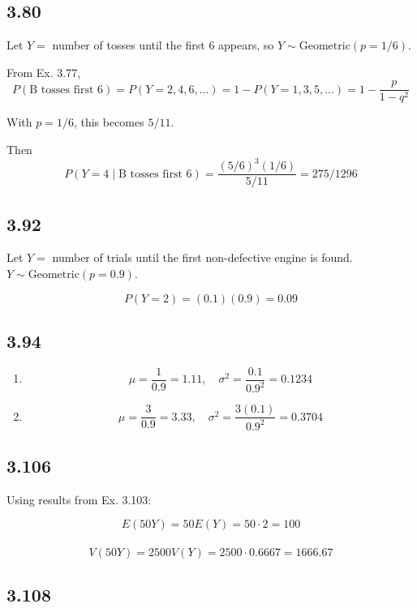 \documentclass[
  letterpaper,
  DIV=11,
  numbers=noendperiod]{scrartcl}
\begin{document}
\subsection{3.80}\label{section-11}

Let \(Y =\) number of tosses until the first 6 appears, so
\(Y \sim \text{Geometric}(p=1/6)\).

From Ex. 3.77,\\
\[P(\text{B tosses first 6}) = P(Y=2,4,6,\ldots) = 1 - P(Y=1,3,5,\ldots) = 1 - \frac{p}{1-q^2}\]

With \(p=1/6\), this becomes \(5/11\).

Then\\
\[P(Y=4 \mid \text{B tosses first 6}) = \frac{(5/6)^3 (1/6)}{5/11} = 275/1296\]

\subsection{3.92}\label{section-12}

Let \(Y =\) number of trials until the first non-defective engine is
found. \(Y \sim \text{Geometric}(p=0.9)\).

\[P(Y=2) = (0.1)(0.9) = 0.09\]

\subsection{3.94}\label{section-13}

\begin{enumerate}
\def\labelenumi{(\alph{enumi})}
\item
  \[\mu = \frac{1}{0.9} = 1.11, \quad \sigma^2 = \frac{0.1}{0.9^2} = 0.1234\]
\item
  \[\mu = \frac{3}{0.9} = 3.33, \quad \sigma^2 = \frac{3(0.1)}{0.9^2} = 0.3704\]
\end{enumerate}

\subsection{3.106}\label{section-14}

Using results from Ex. 3.103:

\[E(50Y) = 50E(Y) = 50 \cdot 2 = 100\]\\
\[V(50Y) = 2500V(Y) = 2500 \cdot 0.6667 = 1666.67\]

\subsection{3.108}\label{section-15}
\end{document}
